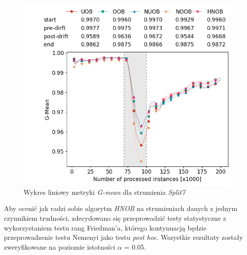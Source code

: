 \begin{figure}[h]
    \centering
    \includegraphics[width=13cm]{figures/split7_gmean.png}
    \caption{Wykres liniowy metryki \textit{G-mean} dla strumienia \textit{Split7}}\label{Figure:Split7}
\end{figure}

\noindent Aby ocenić jak radzi sobie algorytm \textit{HNOB} na strumieniach danych z jednym czynnikiem trudności, zdecydowano się przeprowadzić testy statystyczne z wykorzystaniem testu rang Friedman'a, którego kontynuacją będzie przeprowadzenie testu Nemenyi jako testu \textit{post hoc}. Wszystkie rezultaty zostały zweryfikowane na poziomie istotności $\alpha$ = 0.05.

